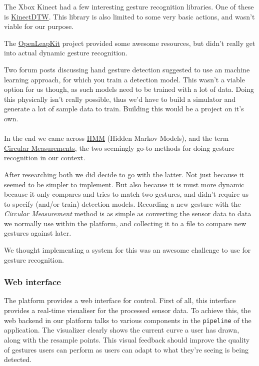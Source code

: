 \documentclass{standalone}
\begin{document}
  The Xbox Kinect had a few interesting gesture recognition libraries. One of
  these is \href{https://archive.codeplex.com/?p=kinectdtw}{KinectDTW}. This
  library is also limited to some very basic actions, and wasn't viable for our
  purpose.

  The
  \href{https://forums.leapmotion.com/t/openleapkit-updated-leap-motion-controller-toolkit-for-common-needs/289}{OpenLeapKit}
  project provided some awesome resources, but didn't really get into actual
  dynamic gesture recognition.

  Two forum posts discussing hand gesture detection suggested to use an machine
  learning approach, for which you train a detection model. This wasn't a viable
  option for us though, as such models need to be trained with a lot of data.
  Doing this physically isn't really possible, thus we'd have to build a
  simulator and generate a lot of sample data to train. Building this would be a
  project on it's own.

  \paragraph{}
  In the end we came across
  \href{http://www.creativedistraction.com/demos/gesture-recognition-kinect-with-hidden-markov-models-hmms/}{HMM}
  (Hidden Markov Models), and the term
  \href{http://delivery.acm.org/10.1145/3140000/3134139/p12-balcazar.pdf}{Circular
  Measurements}, the two seemingly go-to methods for doing gesture recognition
  in our context.

  After researching both we did decide to go with the latter.
  Not just because it seemed to be simpler to implement. But also because it is
  must more dynamic because it only compares and tries to match two gestures,
  and didn't require us to specify (and/or train) detection models.
  Recording a new gesture with the \emph{Circular Measurement} method is as
  simple as converting the sensor data to data we normally use within the
  platform, and collecting it to a file to compare new gestures against later.

  We thought implementing a system for this was an awesome challenge to use for
  gesture recognition.

  \subsubsection{Web interface}
  The platform provides a web interface for control. First of all, this
  interface provides a real-time visualiser for the processed sensor data. To
  achieve this, the web backend in our platform talks to various components in
  the \verb_pipeline_ of the application. The visualizer clearly shows the
  current curve a user has drawn, along with the resample points. This visual
  feedback should improve the quality of gestures users can perform as users
  can adapt to what they're seeing is being detected.
\end{document}
